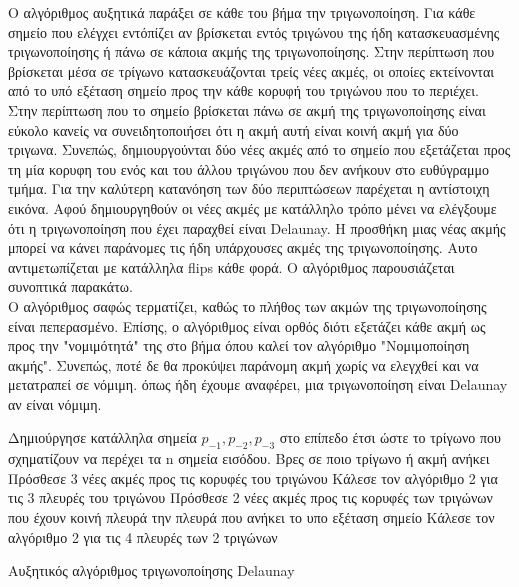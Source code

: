 \documentclass[oneside,12pt]{book}
\theoremstyle{definition}
\begin{document}
Ο αλγόριθμος αυξητικά παράξει σε κάθε του βήμα την τριγωνοποίηση. Για κάθε σημείο που ελέγχει εντόπίζει αν βρίσκεται εντός τριγώνου της ήδη κατασκευασμένης τριγωνοποίησης ή πάνω σε κάποια ακμής της τριγωνοποίησης. Στην περίπτωση που βρίσκεται μέσα σε τρίγωνο κατασκευάζονται τρείς νέες ακμές, οι οποίες εκτείνονται από το υπό εξέταση σημείο προς την κάθε κορυφή του τριγώνου που το περιέχει. Στην περίπτωση που το σημείο βρίσκεται πάνω σε ακμή της τριγωνοποίησης είναι εύκολο κανείς να συνειδητοποιήσει ότι η ακμή αυτή είναι κοινή ακμή για δύο τριγωνα. Συνεπώς, δημιουργούνται δύο νέες ακμές από το σημείο που εξετάζεται προς τη μία κορυφη του ενός και του άλλου τριγώνου που δεν ανήκουν στο ευθύγραμμο τμήμα. Για την καλύτερη κατανόηση των δύο περιπτώσεων παρέχεται η αντίστοιχη εικόνα. Αφού δημιουργηθούν οι νέες ακμές με κατάλληλο τρόπο μένει να ελέγξουμε ότι η τριγωνοποίηση που έχει παραχθεί είναι Delaunay. Η προσθήκη μιας νέας ακμής μπορεί να κάνει παράνομες τις ήδη υπάρχουσες ακμές της τριγωνοποίησης. Αυτο αντιμετωπίζεται με κατάλληλα flips κάθε φορά. Ο αλγόριθμος παρουσιάζεται συνοπτικά παρακάτω. \\

Ο αλγόριθμος σαφώς τερματίζει, καθώς το πλήθος των ακμών της τριγωνοποίησης είναι πεπερασμένο. Επίσης, ο αλγόριθμος είναι ορθός διότι εξετάζει κάθε ακμή ως προς την "νομιμότητά" της στο βήμα όπου καλεί τον αλγόριθμο "Νομιμοποίηση ακμής". Συνεπώς, ποτέ δε θα προκύψει παράνομη ακμή χωρίς να ελεγχθεί και να μετατραπεί σε νόμιμη. όπως ήδη έχουμε αναφέρει, μια τριγωνοποίηση είναι Delaunay αν είναι νόμιμη. \\

\begin{algorithm}[H]
	\SetAlgoLined

	Δημιούργησε κατάλληλα σημεία \(p_{-1}, p_{-2}, p_{-3}\) στο επίπεδο έτσι ώστε το τρίγωνο που σχηματίζουν να περέχει τα n σημεία εισόδου. \;
	{Βρες σε ποιο τρίγωνο ή ακμή ανήκει \;
		{Πρόσθεσε 3 νέες ακμές προς τις κορυφές του τριγώνου \;
		Κάλεσε τον αλγόριθμο 2 για τις 3 πλευρές του τριγώνου \;}
	\Else
		{Πρόσθεσε 2 νέες ακμές προς τις κορυφές των τριγώνων που έχουν κοινή πλευρά την πλευρά που ανήκει το υπο εξέταση σημείο \;
		Κάλεσε τον αλγόριθμο 2 για τις 4 πλευρές των 2 τριγώνων \;}
	}

	\caption{Αυξητικός αλγόριθμος τριγωνοποίησης Delaunay}
\end{algorithm}
\end{document}
